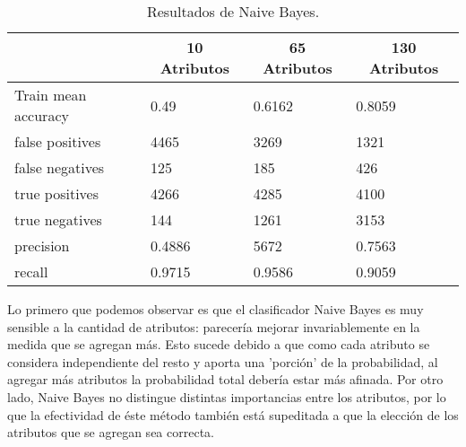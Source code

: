\documentclass[10pt,a4paper]{article}
\begin{document}
\begin{table}[H]
	\centering
	\begin{tabular}{|l|l|l|l|}
		\hline
		\textbf{}          & \multicolumn{1}{c|}{\textbf{10 Atributos}} & \multicolumn{1}{c|}{\textbf{65 Atributos}} & \multicolumn{1}{c|}{\textbf{130 Atributos}} \\ \hline
		Train mean accuracy & 0.49                                       & 0.6162                                     & 0.8059                                      \\ \hline
		false positives    & 4465                                       & 3269                                       & 1321                                        \\ \hline
		false negatives    & 125                                        & 185                                        & 426                                         \\ \hline
		true positives     & 4266                                       & 4285                                       & 4100                                        \\ \hline
		true negatives     & 144                                        & 1261                                       & 3153                                        \\ \hline
		precision          & 0.4886                                     & 5672                                       & 0.7563                                      \\ \hline
		recall             & 0.9715                                     & 0.9586                                     & 0.9059                                      \\ \hline
	\end{tabular}
	\caption{Resultados de Naive Bayes.}
		\label{naive}
\end{table}

Lo primero que podemos observar es que el clasificador Naive Bayes es muy sensible a la cantidad de atributos: parecería mejorar invariablemente en la medida que se agregan más. Esto sucede debido a que como cada atributo se considera independiente del resto y aporta una 'porción' de la probabilidad, al agregar más atributos la probabilidad total debería estar más afinada. Por otro lado, Naive Bayes no distingue distintas importancias entre los atributos, por lo que la efectividad de éste método también está supeditada a que la elección de los atributos que se agregan sea correcta.
\end{document}
